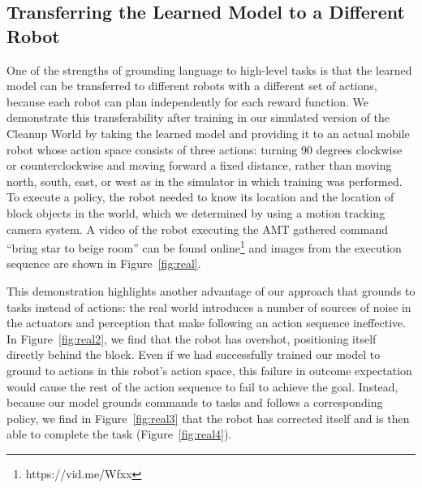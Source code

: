 \documentclass[conference]{IEEEtran}
\begin{document}
\subsection{Transferring the Learned Model to a Different Robot}
One of the strengths of grounding language to high-level tasks is that the learned model can be transferred to different robots with a different set of actions, because each robot can plan independently for each reward function. We demonstrate this transferability after training in our simulated version of the Cleanup World by taking the learned model and providing it to an actual mobile robot whose action space consists of three actions: turning 90 degrees clockwise or counterclockwise and moving forward a fixed distance, rather than moving north, south, east, or west as in the simulator in which training was performed. To execute a policy, the robot needed to know its location and the location of block objects in the world, which we determined by using a motion tracking camera system. A video of the robot executing the AMT gathered command ``bring star to beige room'' can be found online\footnote{https://vid.me/Wfxx} and images from the execution sequence are shown in Figure~\ref{fig:real}.

This demonstration highlights another advantage of our approach that grounds to tasks instead of actions: the real world introduces a number of sources of noise in the actuators and perception that make following an action sequence ineffective. In Figure~\ref{fig:real2}, we find that the robot has overshot, positioning itself directly behind the block. Even if we had successfully trained our model to ground to actions in this robot's action space, this failure in outcome expectation would cause the rest of the action sequence to fail to achieve the goal. Instead, because our model grounds commands to tasks and follows a corresponding policy, we find in Figure~\ref{fig:real3} that the robot has corrected itself and is then able to complete the task (Figure~\ref{fig:real4}).
\end{document}
